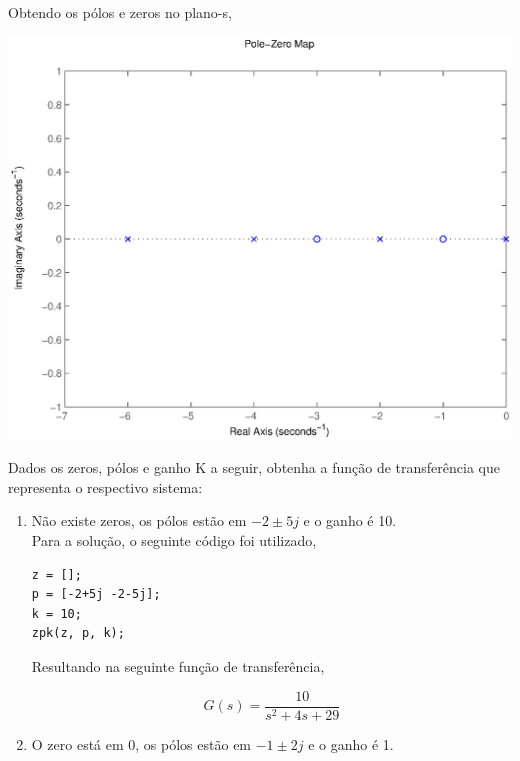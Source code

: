 \documentclass[a4paper, 10pt]{article}
\begin{document}
\begin{list}{\textbf{Questão .}}{
\setlength{\labelwidth}{-2mm} \setlength{\parsep}{0mm}
\setlength{\topsep}{0mm} \setlength{\leftmargin}{0mm}}
     Obtendo os pólos e zeros no plano-s,
        \begin{center}
                \includegraphics[scale=0.6]{fig3q.eps}
             \end{center}

     



\newpage

         \item
             Dados os zeros, pólos e ganho K a seguir, obtenha a função de transferência 
             que representa o respectivo sistema:
        \begin{enumerate}
            \item

                Não existe zeros, os pólos estão em $-2\pm5j$ e o ganho é 10.\\
                
                Para a solução, o seguinte código foi utilizado,

                \begin{lstlisting}
z = [];
p = [-2+5j -2-5j];
k = 10;
zpk(z, p, k);               
                \end{lstlisting}

                Resultando na seguinte função de transferência,

                $$
                G(s) = \frac{10}{s^2 + 4 s + 29}
                $$



             \item
                 O zero está em 0, os pólos estão em $-1\pm2j$ e o ganho é 1.\\


\end{enumerate}
\end{list}
\end{document}
